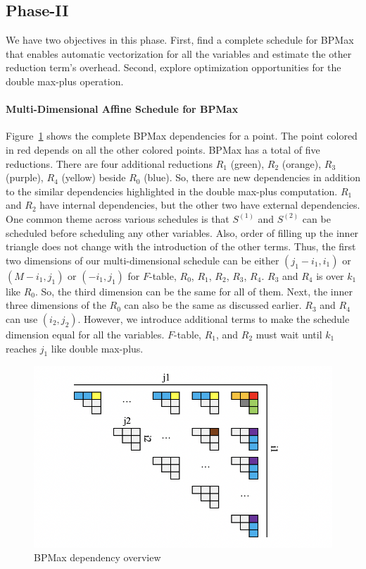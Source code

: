 \subsection{Phase-II}
We have two objectives in this phase. First, find a complete schedule for BPMax that enables automatic vectorization for all the variables and estimate the other reduction term's overhead. Second, explore optimization opportunities for the double max-plus operation.
 
\paragraph{Multi-Dimensional Affine Schedule for BPMax}
Figure~\ref{fig:bpmax_dependency} shows the complete BPMax dependencies for a point. The point colored in red depends on all the other colored points.  BPMax has a total of five reductions. There are four additional reductions $R_{1}$ (green), $R_{2}$ (orange), $R_{3}$ (purple), $R_{4}$ (yellow) beside $R_{0}$ (blue). So, there are new dependencies in addition to the similar dependencies highlighted in the double max-plus computation. $R_{1}$ and $R_{2}$  have internal dependencies, but the other two have external dependencies. One common theme across various schedules is that $S^{(1)}$ and $S^{(2)}$ can be scheduled before scheduling any other variables. Also, order of filling up the inner triangle does not change with the introduction of the other terms. Thus, the first two dimensions of our multi-dimensional schedule can be either $(j_{1}-i_{1}, i_{1})$ or $(M-i_{1}, j_{1})$ or $(-i_{1}, j_{1})$ for $F$-table, $R_{0}$, $R_{1}$, $R_{2}$, $R_{3}$, $R_{4}$. $R_{3}$ and $R_{4}$ is over $k_{1}$ like $R_{0}$. So, the third dimension can be the same for all of them. Next, the inner three dimensions of the $R_{0}$ can also be the same as discussed earlier. $R_{3}$ and $R_{4}$  can use $(i_{2}, j_{2})$. However, we introduce additional terms to make the schedule dimension equal for all the variables. $F$-table, $R_{1}$, and $R_{2}$ must wait until $k_{1}$ reaches $j_{1}$ like double max-plus. 
\begin{figure}[htbp]
\begin{adjustbox}{varwidth=\textwidth,margin=0 {\abovecaptionskip} 0 0, frame=0.00pt}
\centerline{\includegraphics[scale=.66]{bpmax_dependency_new.png}}
\end{adjustbox}
\caption{BPMax dependency overview}
\label{fig:bpmax_dependency}
\end{figure}

